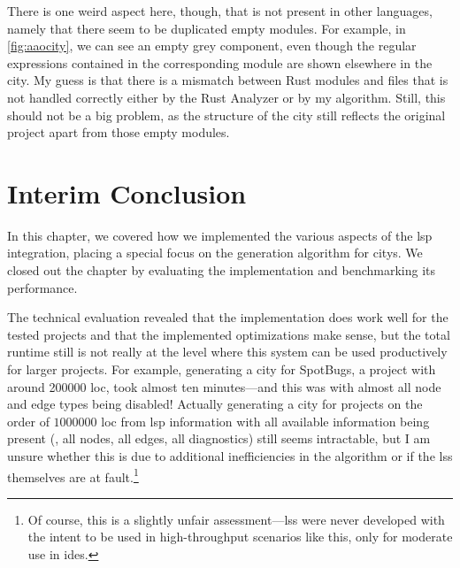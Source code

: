 \documentclass[../thesis]{subfiles}
\begin{document}
There is one weird aspect here, though, that is not present in other languages, namely that there seem to be duplicated empty modules.
For example, in \cref{fig:aaocity}, we can see an empty grey  component, even though the regular expressions contained in the corresponding module are shown elsewhere in the city.
My guess is that there is a mismatch between Rust modules and files that is not handled correctly either by the Rust Analyzer or by my algorithm.
Still, this should not be a big problem, as the structure of the \gls{city} still reflects the original project apart from those empty modules.

\section{Interim Conclusion}\label{sec:implconclusion}
In this chapter, we covered how we implemented the various aspects of the \gls{lsp} integration, placing a special focus on the generation algorithm for \glspl{city}.
We closed out the chapter by evaluating the implementation and benchmarking its performance.

The technical evaluation revealed that the implementation does work well for the tested projects and that the implemented optimizations make sense, but the total runtime still is not really at the level where this system can be used productively for larger projects.
For example, generating a city for SpotBugs, a project with around \num{200000} \gls{loc}, took almost ten minutes---and this was with almost all node and edge types being disabled!
Actually generating a \gls{city} for projects on the order of $\num{1000000}$ \gls{loc} from \gls{lsp} information with all available information being present (\ie, all nodes, all edges, all diagnostics) still seems intractable, but I am unsure whether this is due to additional inefficiencies in the algorithm or if the \glspl{ls} themselves are at fault.\footnote{
	Of course, this is a slightly unfair assessment---\glspl{ls} were never developed with the intent to be used in high-throughput scenarios like this, only for moderate use in \glspl{ide}.
}
\end{document}
